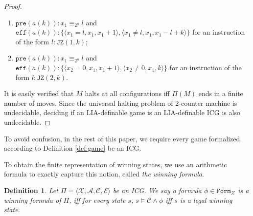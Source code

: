 \documentclass[review]{elsarticle}
\newcommand{\formula}{\mathtt{Form}}
\newcommand{\set}[1]{\{ #1 \}}
\newcommand{\tuple}[1]{\langle {#1} \rangle}
\newcommand{\statevar}{\mathcal{X}}
\newcommand{\winSet}{\mathcal{W}}
\newcommand{\act}{\mathcal{A}}
\newcommand{\constraint}{\mathcal{C}}
\newcommand{\estate}{\mathcal{E}}
\newcommand{\pre}{\mathtt{pre}}
\newcommand{\eff}{\mathtt{eff}}
\newcommand{\suc}{\tau}
\newcommand{\modulo}{\equiv}
\newcommand{\jumpZero}[1][]{\mathtt{JZ}(#1)}
\newtheorem{definition}{Definition}
\begin{document}
\begin{proof}
\begin{enumerate}
			\item $\pre(a(k)): x_1 \modulo_{2^n} l$ and $\eff(a(k)) : \set{\tuple{x_1 = l, x_1, x_1 + 1}, \tuple{x_1 \neq l, x_1, x_1 - l + k}}$ for an instruction of the form $l: \jumpZero[1, k]$;
			
			\item $\pre(a(k)): x_1 \modulo_{2^n} l$ and $\eff(a(k)) : \set{\tuple{x_2 = 0, x_1, x_1 + 1}, \tuple{x_2 \neq 0, x_1, k}}$ for an instruction of the form $l: \jumpZero[2, k]$.
		\end{enumerate}
		
		It is easily verified that $M$ halts at all configurations iff $\Pi(M)$ ends in a finite number of moves.
		Since the universal halting problem of $2$-counter machine is undecidable, deciding if an LIA-definable game is an LIA-definable ICG is also undecidable.
	\end{proof}
	
	To avoid confusion, in the rest of this paper, we require every game formalized according to Definition \ref{def:game} be an ICG.

	
    To obtain the finite representation of winning states, we use an arithmetic formula to exactly capture this notion, called \textit{the winning formula}.
	\begin{definition} \label{def:winForm} \rm
		Let $\Pi = \tuple{\statevar, \act, \constraint, \estate}$ be an ICG. %
		We say a formula $\phi \in \formula_{\statevar}$ is a \textit{winning formula} of $\Pi$, iff for every state $s$, $s \models \constraint \land \phi$ iff $s$ is a legal winning state.
	\end{definition}
\end{document}
